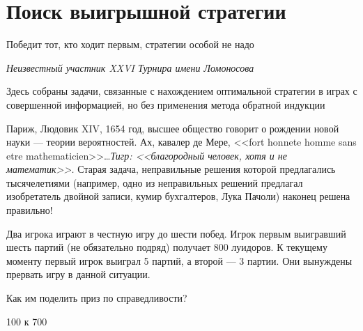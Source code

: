 

\section{Поиск выигрышной стратегии}
Победит тот, кто ходит первым, стратегии особой не надо

{\it Неизвестный участник  XXVI  Турнира имени Ломоносова}


Здесь собраны задачи, связанные с нахождением оптимальной стратегии в играх с совершенной информацией, но без применения метода обратной индукции


\begin{problem} \par
Париж, Людовик XIV, 1654 год, высшее общество говорит о рождении новой науки --- теории вероятностей. Ах, кавалер де Мере, <<fort honnete homme sans etre mathematicien>>\ldots {\it Тигр:  <<благородный человек, хотя и не математик>>.} Старая задача, неправильные решения которой предлагались тысячелетиями (например, одно из неправильных решений предлагал изобретатель двойной записи, кумир бухгалтеров, Лука Пачоли) наконец решена правильно!\par
Два игрока играют в честную игру до шести побед. Игрок первым выигравший шесть партий (не обязательно подряд) получает 800 луидоров. К текущему моменту первый игрок выиграл 5 партий, а второй --- 3 партии. Они вынуждены прервать игру в данной ситуации.\par
Как им поделить приз по справедливости?



\begin{sol}
100 к 700
\end{sol}
\end{problem}





